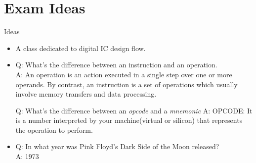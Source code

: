 
\section{Exam Ideas}
\begin{frame}{Ideas}
\begin{itemize}
\item A class dedicated to digital IC design flow. 
\item
\alert{Q: What's the difference between an instruction and an operation.}\\
\alert{A: An operation is an action executed in a single step over one or more operands. By contrast, an instruction is a set of operations which usually involve memory transfers and data processing.}

\alert{Q: What's the difference between an \emph{opcode} and a \emph{mnemonic}}
\alert{A: OPCODE: It is a number interpreted by your machine(virtual or silicon) that represents the operation to perform. }
\item \alert{Q: In what year was Pink Floyd's Dark Side of the Moon released?}\\ \alert{A: 1973}
\end{itemize}
\end{frame}





